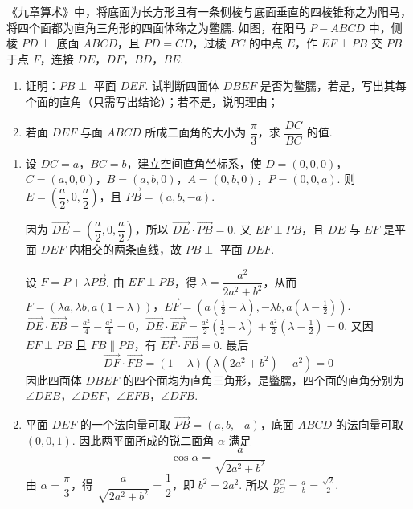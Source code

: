 \begin{problem}
《九章算术》中，将底面为长方形且有一条侧棱与底面垂直的四棱锥称之为阳马，将四个面都为直角三角形的四面体称之为鳖臑. 如图，在阳马 \(P-ABCD\) 中，侧棱 \(PD\perp\) 底面 \(ABCD\)，且 \(PD=CD\)，过棱 \(PC\) 的中点 \(E\)，作 \(EF\perp PB\) 交 \(PB\) 于点 \(F\)，连接 \(DE\)，\(DF\)，\(BD\)，\(BE\).

\begin{enumerate}
\item 证明：\(PB\perp\) 平面 \(DEF\). 试判断四面体 \(DBEF\) 是否为鳖臑，若是，写出其每个面的直角（只需写出结论）；若不是，说明理由；
\item 若面 \(DEF\) 与面 \(ABCD\) 所成二面角的大小为 \(\dfrac\pi3\)，求 \(\dfrac{DC}{BC}\) 的值.
\end{enumerate}

\end{problem}

\begin{solution}
\begin{enumerate}
\item
设 \(DC=a\)，\(BC=b\)，建立空间直角坐标系，使
\(D=(0,0,0)\)，\(C=(a,0,0)\)，\(B=(a,b,0)\)，\(A=(0,b,0)\)，\(P=(0,0,a)\). 则
\(E=\left(\dfrac a2,0,\dfrac a2\right)\)，且 \(\overrightarrow{PB}=(a,b,-a)\).

因为 \(\overrightarrow{DE}=\left(\dfrac a2,0,\dfrac a2\right)\)，所以 \(\overrightarrow{DE}\cdot\overrightarrow{PB}=0\). 又 \(EF\perp PB\)，且 \(DE\) 与 \(EF\) 是平面 \(DEF\) 内相交的两条直线，故 \(PB\perp\) 平面 \(DEF\).

设 \(F=P+\lambda\overrightarrow{PB}\). 由 \(EF\perp PB\)，得 \(\lambda=\dfrac{a^2}{2a^2+b^2}\)，从而
\(F=(\lambda a,\lambda b,a(1-\lambda))\)，\(\overrightarrow{EF}=\left(a\left(\frac12-\lambda\right),-\lambda b,a\left(\lambda-\frac12\right)\right)\).
\(\overrightarrow{DE}\cdot\overrightarrow{EB} =\frac{a^2}{4}-\frac{a^2}{4}=0\)，\(\overrightarrow{DE}\cdot\overrightarrow{EF} =\frac{a^2}{2}\left(\frac12-\lambda\right)+\frac{a^2}{2}\left(\lambda-\frac12\right)=0\).
又因 \(EF\perp PB\) 且 \(FB\parallel PB\)，有 \(\overrightarrow{EF}\cdot\overrightarrow{FB}=0\). 最后
\[
\overrightarrow{DF}\cdot\overrightarrow{FB}
=(1-\lambda)\left(\lambda(2a^2+b^2)-a^2\right)=0
\]
因此四面体 \(DBEF\) 的四个面均为直角三角形，是鳖臑，四个面的直角分别为 \(\angle DEB\)，\(\angle DEF\)，\(\angle EFB\)，\(\angle DFB\).

\item 平面 \(DEF\) 的一个法向量可取 \(\overrightarrow{PB}=(a,b,-a)\)，底面 \(ABCD\) 的法向量可取 \((0,0,1)\). 因此两平面所成的锐二面角 \(\alpha\) 满足
\[
\cos\alpha=\frac{a}{\sqrt{2a^2+b^2}}
\]
由 \(\alpha=\dfrac\pi3\)，得 \(\dfrac a{\sqrt{2a^2+b^2}}=\dfrac12\)，即 \(b^2=2a^2\). 所以
\(\displaystyle\frac{DC}{BC}=\frac ab=\frac{\sqrt2}{2}\).
\end{enumerate}
\end{solution}

